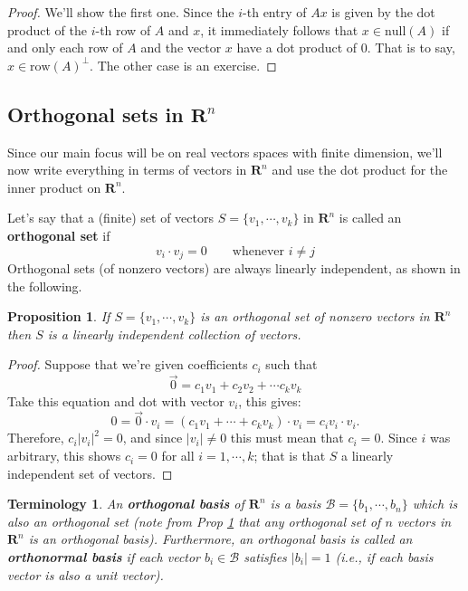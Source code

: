 \documentclass[12pt]{article}
\numberwithin{equation}{subsection}
\numberwithin{figure}{subsection}
\newtheorem{prop}[subsection]{Proposition}
\theoremstyle{note}
\newtheorem{terminology}[subsection]{Terminology}
\newcommand{\R}{\mathbf{R}}
\newcommand\nul[1]{\mathrm{null}(#1)}
\newcommand\row[1]{\mathrm{row}(#1)}
\begin{document}
\begin{proof}
We'll show the first one. Since the $i$-th entry of $Ax$ is given by the dot product of the $i$-th row of $A$ and $x$, it immediately follows that $x\in \nul{A}$ if and only each row of $A$ and the vector $x$ have a dot product of $0$. That is to say, $x\in \row{A}^{\perp}.$ The other case is an exercise.
\end{proof}


\subsection{Orthogonal sets in $\R^n$}
Since our main focus will be on real vectors spaces with finite dimension, we'll now write everything in terms of vectors in $\R^n$ and use the dot product for the inner product on $\R^n$. %

Let's say that a (finite) set of vectors $S=\{v_1,\cdots,v_k\}$ in $\R^n$ is called an \textbf{orthogonal set} if \begin{equation} v_i\cdot v_j=0 \qquad \text{whenever $i\neq j$}\end{equation} Orthogonal sets (of nonzero vectors) are always linearly independent, as shown in the following.

 \begin{prop} \label{prop-orth-li}
	If $S=\{v_1,\cdots,v_k\}$ is an orthogonal set of nonzero vectors in $\R^n$ then $S$ is a linearly independent collection of vectors. 
\end{prop}
\begin{proof}
	Suppose that we're given coefficients $c_i$ such that \[ \vec{0}=c_1v_1+c_2v_2+\cdots c_kv_k\] Take this equation and dot with vector $v_i$, this gives: \[ 0 =\vec{0}\cdot v_i = (c_1 v_1+\cdots +c_k v_k)\cdot v_i= c_i v_i\cdot v_i.\] Therefore, $c_i |v_i|^2=0$, and since $|v_i|\neq0$ this must mean that $c_i=0$. Since $i$ was arbitrary, this shows $c_i=0$ for all $i=1,\cdots,k$; that is that $S$ a linearly independent set of vectors.
\end{proof}
 
\begin{terminology} An \textbf{orthogonal basis} of $\R^n$ is a basis $\mathcal{B}=\{ b_1,\cdots , b_n\}$ which is also an orthogonal set (note from Prop \ref{prop-orth-li} that any orthogonal set of $n$ vectors in $\R^n$ is an orthogonal basis). Furthermore, an orthogonal basis is called an \textbf{orthonormal basis} if each vector $b_i\in \mathcal{B}$ satisfies $|b_i|=1$ (i.e., if each basis vector is also a unit vector).
\end{terminology}
\end{document}
